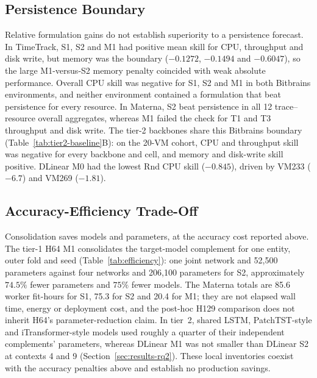 \documentclass[5p,twocolumn]{elsarticle}
\begin{document}
\subsection{Persistence Boundary}
\label{sec:results-persistence}

Relative formulation gains do not establish superiority to a persistence
forecast. In TimeTrack, S1, S2 and M1 had positive mean skill for CPU,
throughput and disk write, but memory was the boundary ($-0.1272$, $-0.1494$
and $-0.6047$), so the large M1-versus-S2 memory penalty coincided with weak
absolute performance. Overall CPU skill was negative for S1, S2 and M1 in both
Bitbrains environments, and neither environment contained a formulation that
beat persistence for every resource. In Materna, S2 beat persistence in all 12
trace--resource overall aggregates, whereas M1 failed the check for T1 and T3
throughput and disk write.
The tier-2 backbones share this Bitbrains boundary
(Table~\ref{tab:tier2-baseline}B): on the 20-VM cohort, CPU and throughput
skill was negative for every backbone and cell, and memory and disk-write
skill positive. DLinear M0 had the lowest Rnd CPU skill ($-0.845$), driven
by VM233 ($-6.7$) and VM269 ($-1.81$).

\subsection{Accuracy-Efficiency Trade-Off}
\label{sec:results-efficiency}

Consolidation saves models and parameters, at the accuracy cost reported
above. The tier-1 H64 M1 consolidates the target-model complement for one entity,
outer fold and seed (Table~\ref{tab:efficiency}): one joint network and
52,500 parameters against four networks and 206,100 parameters for S2,
approximately $74.5\%$ fewer parameters and $75\%$ fewer models. The
Materna totals are 85.6 worker fit-hours for S1, 75.3 for S2 and
20.4 for M1; they are not elapsed wall time, energy or deployment cost,
and the post-hoc H129 comparison does not inherit H64's parameter-reduction
claim. In tier~2, shared LSTM, PatchTST-style and iTransformer-style models
used roughly a quarter of their independent complements' parameters, whereas
DLinear M1 was not smaller than DLinear S2 at contexts 4 and 9
(Section~\ref{sec:results-rq2}). These local inventories coexist with the
accuracy penalties above and establish no production savings.
\end{document}
